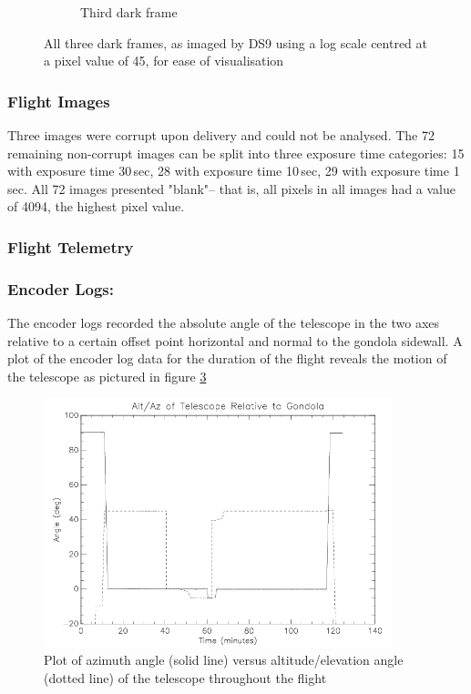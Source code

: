 {\begin{figure}[h]
\begin{subfigure}{0.49\textwidth}
		\caption{Third dark frame}
		\label{fig:sub:d2}
	\end{subfigure}
	\caption{All three dark frames, as imaged by DS9 using a log scale centred at a pixel value of 45, for ease of visualisation}
\end{figure}

\subsubsection{Flight Images} 
Three images were corrupt upon delivery and could not be analysed. The 72 remaining non-corrupt images can be split into three exposure time categories: 15 with exposure time 30\,sec, 28 with exposure time 10\,sec, 29 with exposure time 1\,sec. All 72 images presented "blank"-- that is, all pixels in all images had a value of 4094, the highest pixel value. 

\newpage
\subsubsection{Flight Telemetry}

\subsubsection*{Encoder Logs:}
The encoder logs recorded the absolute angle of the telescope in the two axes relative to a certain offset point horizontal and normal to the gondola sidewall. A plot of the encoder log data for the duration of the flight reveals the motion of the telescope as pictured in figure \ref{fig:altaz}

\begin{figure}[htbp]
    \centering
    \includegraphics[width=0.9\textwidth]{appendix/img/campaign_results/altaz.jpg}
    \caption{Plot of azimuth angle (solid line) versus altitude/elevation angle (dotted line) of the telescope throughout the flight}
    \label{fig:altaz}
\end{figure}

}
